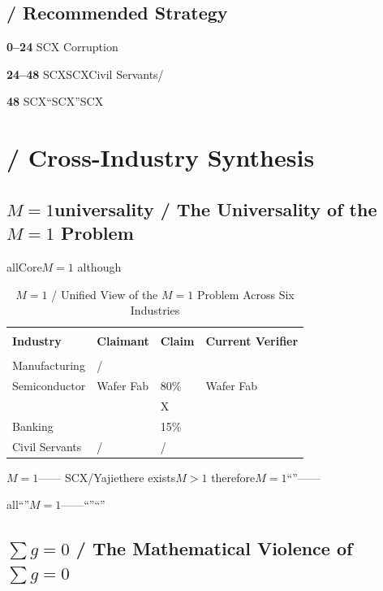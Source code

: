 \documentclass[12pt,a4paper]{article}
\theoremstyle{remark}
\newcommand{\sumgeq}{\sum g = 0}
\begin{document}
\subsection{ / Recommended Strategy}

\textbf{0--24}
SCX
Corruption

\textbf{24--48}
SCXSCXCivil Servants/

\textbf{48}
SCX``SCX''SCX

\section{ / Cross-Industry Synthesis}

\subsection{$M=1$universality / The Universality of the $M=1$ Problem}

allCore\textbf{$M=1$}
although

\begin{table}[H]
\centering
\caption{$M=1$ / Unified View of the $M=1$ Problem Across Six Industries}
\label{tab:unified}
\begin{tabular}{@{}p{2.5cm}p{2.5cm}p{4cm}p{4cm}@{}}
\toprule
\textbf{} & \textbf{} & \textbf{} & \textbf{} \\
\textbf{Industry} & \textbf{Claimant} & \textbf{Claim} & \textbf{Current Verifier} \\
\midrule
 &  &  &  \\
Manufacturing & / &  &  \\
Semiconductor & Wafer Fab & 80\% & Wafer Fab \\
 &  & X &  \\
Banking &  & 15\% &  \\
Civil Servants & / & / &  \\
\bottomrule
\end{tabular}
\end{table}

$M=1$——
SCX/Yajiethere exists$M>1$
therefore$M=1$``''——\textbf{}

all``''$M=1$——``''``''

\subsection{$\sumgeq$ / The Mathematical Violence of $\sumgeq$}
\end{document}
